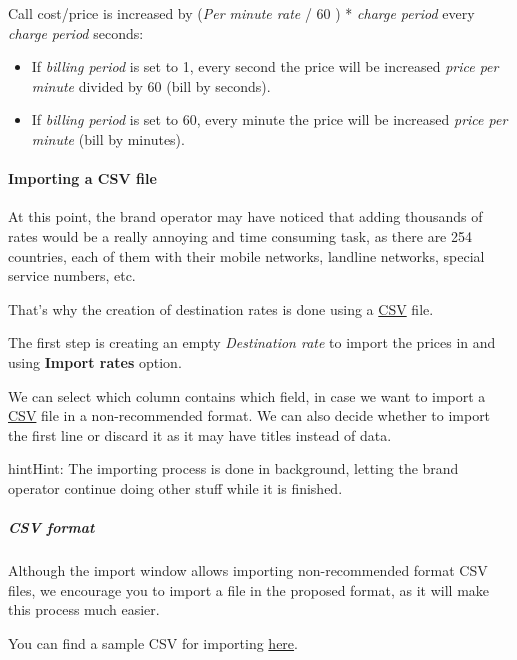 \documentclass[letterpaper,10pt,english]{sphinxmanual}
\begin{document}
Call cost/price is increased by (\emph{Per minute rate} / 60 ) * \emph{charge period} every \emph{charge period} seconds:
\begin{itemize}
\item {} 
If \emph{billing period} is set to 1, every second the price will be increased
\emph{price per minute} divided by 60 (bill by seconds).

\item {} 
If \emph{billing period} is set to 60, every minute the price will be increased
\emph{price per minute} (bill by minutes).

\end{itemize}


\paragraph{Importing a CSV file}
\label{administration_portal/brand/billing/destination_rates:importing-a-csv-file}
At this point, the brand operator may have noticed that adding thousands
of rates would be a really annoying and time consuming task, as there
are 254 countries, each of them with their mobile networks, landline networks,
special service numbers, etc.

That's why the creation of destination rates is done using a
\href{https://es.wikipedia.org/wiki/CSV}{CSV} file.

The first step is creating an empty \emph{Destination rate} to import the prices in and using \textbf{Import rates} option.

We can select which column contains which field, in case we want to import a
\href{https://es.wikipedia.org/wiki/CSV}{CSV} file in a non-recommended format. We
can also decide whether to import the first line or discard it as it may have
titles instead of data.

\begin{notice}{hint}{Hint:}
The importing process is done in background, letting the brand operator
continue doing other stuff while it is finished.
\end{notice}


\subparagraph{CSV format}
\label{administration_portal/brand/billing/destination_rates:csv-format}
Although the import window allows importing non-recommended format CSV files,
we encourage you to import a file in the proposed format, as it will make
this process much easier.

You can find a sample CSV for importing \href{https://raw.githubusercontent.com/irontec/ivozprovider/artemis/web/admin/samples/pricesSample.csv}{here}.
\end{document}
